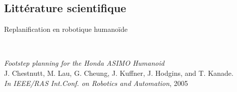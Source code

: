 \documentclass{beamer}
\begin{document}
\subsection*{Littérature scientifique}
\begin{frame}
  \center Replanification en robotique humanoïde
  \begin{figure}
    ~
    \\
  \end{figure}

  \begin{small}
    \emph{Footstep planning for the Honda ASIMO Humanoid}\\
    J. Chestnutt, M. Lau, G. Cheung, J. Kuffner, J. Hodgins, and T. Kanade.\\
    \textit{In IEEE/RAS Int.Conf. on Robotics and Automation}, 2005
  \end{small}

\end{frame}

%
%
\end{document}
